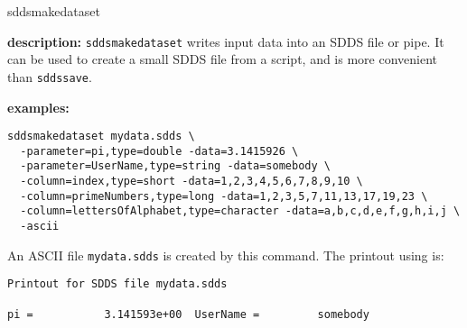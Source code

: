 \begin{sddsprog}{sddsmakedataset}
\item \textbf{description:} \verb|sddsmakedataset| writes input data into an SDDS file or pipe. It can be used to create a small SDDS file from a script, and is more convenient than \verb|sddssave|.
\item \textbf{examples:}
\begin{verbatim}
sddsmakedataset mydata.sdds \
  -parameter=pi,type=double -data=3.1415926 \
  -parameter=UserName,type=string -data=somebody \
  -column=index,type=short -data=1,2,3,4,5,6,7,8,9,10 \
  -column=primeNumbers,type=long -data=1,2,3,5,7,11,13,17,19,23 \
  -column=lettersOfAlphabet,type=character -data=a,b,c,d,e,f,g,h,i,j \
  -ascii
\end{verbatim}
An ASCII file \verb|mydata.sdds| is created by this command. The printout using  is:
\begin{verbatim}
Printout for SDDS file mydata.sdds

pi =           3.141593e+00  UserName =         somebody


\end{verbatim}
\end{sddsprog}
